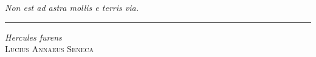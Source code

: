 \thispagestyle{empty}

  \vspace*{.15\paperheight}

  \begin{flushright}
    \emph{\large Non est ad astra mollis e terris via.}

    \bigskip
    
    \begin{minipage}[h]{  \iftoggle{libro}{.44\linewidth}{.42\linewidth} }
      \rule{1\textwidth}{0.4pt}
      
      \emph{Hercules furens} \\ \textsc{Lucius Annaeus Seneca}
    \end{minipage}
  
  \end{flushright}


